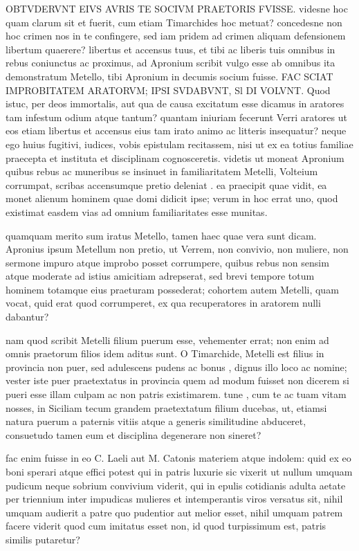  OBTVDERVNT EIVS AVRIS TE SOCIVM PRAETORIS FVISSE. videsne hoc quam clarum sit et fuerit, cum etiam Timarchides hoc metuat? concedesne non hoc crimen nos in te confingere, sed iam pridem ad crimen aliquam defensionem libertum quaerere? libertus et accensus tuus, et tibi ac liberis tuis omnibus in rebus coniunctus ac proximus, ad Apronium scribit vulgo esse ab omnibus ita demonstratum Metello, tibi Apronium in decumis socium fuisse. FAC SCIAT IMPROBITATEM ARATORVM; IPSI SVDABVNT, Sl DI VOLVNT. Quod istuc, per deos immortalis, aut qua de causa excitatum esse dicamus in aratores tam infestum odium atque tantum? quantam iniuriam fecerunt Verri aratores ut eos etiam libertus et accensus eius tam irato animo ac litteris insequatur? neque ego huius fugitivi, iudices, vobis epistulam recitassem, nisi ut ex ea totius familiae praecepta et instituta et disciplinam cognosceretis. videtis ut moneat Apronium quibus rebus ac muneribus se insinuet in familiaritatem Metelli, Volteium corrumpat, scribas accensumque pretio deleniat . ea praecipit quae vidit, ea monet alienum hominem quae domi didicit ipse; verum in hoc errat uno, quod existimat easdem vias ad omnium familiaritates esse munitas.

 quamquam merito sum iratus Metello, tamen haec quae vera sunt dicam. Apronius ipsum Metellum non pretio, ut Verrem, non convivio, non muliere, non sermone impuro atque improbo posset corrumpere, quibus rebus non sensim atque moderate ad istius amicitiam adrepserat, sed brevi tempore totum hominem totamque eius praeturam possederat; cohortem autem Metelli, quam vocat, quid erat quod corrumperet, ex qua recuperatores in aratorem nulli dabantur?

 nam quod scribit Metelli filium puerum esse, vehementer errat; non enim ad omnis praetorum filios idem aditus sunt. O Timarchide, Metelli est filius in provincia non puer, sed adulescens pudens ac bonus , dignus illo loco ac nomine; vester iste puer praetextatus in provincia quem ad modum fuisset non dicerem si pueri esse illam culpam ac non patris existimarem. tune , cum te ac tuam vitam nosses, in Siciliam tecum grandem praetextatum filium ducebas, ut, etiamsi natura puerum a paternis vitiis atque a generis similitudine abduceret, consuetudo tamen eum et disciplina degenerare non sineret?

 fac enim fuisse in eo C. Laeli aut M. Catonis materiem atque indolem: quid ex eo boni sperari atque effici potest qui in patris luxurie sic vixerit ut nullum umquam pudicum neque sobrium convivium viderit, qui in epulis cotidianis adulta aetate per triennium inter impudicas mulieres et intemperantis viros versatus sit, nihil umquam audierit a patre quo pudentior aut melior esset, nihil umquam patrem facere viderit quod cum imitatus esset non, id quod turpissimum est, patris similis putaretur?

